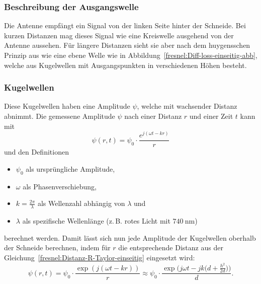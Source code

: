 \subsubsection{Beschreibung der Ausgangswelle}
Die Antenne empfängt ein Signal von der linken Seite 
hinter der Schneide.
Bei kurzen Distanzen mag dieses Signal
wie eine Kreiswelle ausgehend von der Antenne aussehen.
Für längere Distanzen sieht sie aber nach dem huygensschen Prinzip \cite{fresnel:huygenssches-prinzip}
%
%
aus wie eine ebene Welle wie in Abbildung~\ref{fresnel:Diff-loss-einseitig-abb},
welche aus Kugelwellen mit Ausgangspunkten in verschiedenen Höhen besteht.

\subsubsection{Kugelwellen} %
Diese Kugelwellen haben eine Amplitude $\psi$,
welche mit wachsender Distanz abnimmt.
Die gemessene Amplitude $\psi$ nach einer Distanz $r$ und einer Zeit $t$ kann mit
\begin{equation}
    \psi (r,t)
    =
    \psi_0 \cdot \frac{e^{j(\omega t -kr)}}{r}
\end{equation}
und den Definitionen
\begin{itemize}
    \item 
    $\psi_0$ als ursprüngliche Amplitude,
    \item 
    $\omega$ als Phasenverschiebung,
%
    \item 
    $k = \frac{2 \pi}{\lambda}$ als Wellenzahl abhängig von $\lambda$ und
%
    \item 
    $\lambda$ als spezifische Wellenlänge (z.\,B. rotes Licht mit $\qty{740}{\nano\metre}$)
\end{itemize}
berechnet werden.
Damit lässt sich nun jede Amplitude 
der Kugelwellen oberhalb der Schneide berechnen,
indem für $r$ die entsprechende 
Distanz aus der Gleichung~\eqref{fresnel:Distanz-R-Taylor-einseitig} eingesetzt wird:
\begin{equation}
    \psi(r,t)
    =
    \psi_0 \cdot \frac{\exp\left(j(\omega t -kr)\right)}{r}
    \approx
    \psi_0 \cdot \frac{\exp\biggl(j\omega t -jk\biggl(d+\displaystyle\frac{h^2}{2d}\biggr)\biggr)}{d}.
    \label{fresnel:Amplitude-r-komplett-einseitig}
\end{equation}

